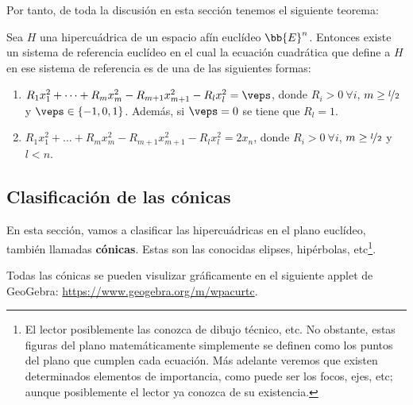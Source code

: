 Por tanto, de toda la discusión en esta sección tenemos el siguiente teorema:
\begin{teo}\label{teo:Clasif_Hiper}
    Sea $H$ una hipercuádrica de un espacio afín euclídeo $\bb{E}^n$. Entonces existe un sistema de referencia euclídeo en el cual la ecuación cuadrática que define a $H$ en ese sistema de referencia es de una de las siguientes formas:
    \begin{enumerate}
        \item $R_1x_1^2 + \dots + R_{m}x_{m}^2 - R_{m+1}x_{m+1}^2 - R_{l}x_{l}^2 = \veps$, donde $R_i>0~ \forall i$, $m\geq \nicefrac{l}{2}$ y $\veps \in \{-1,0,1\}$. Además, si $\veps=0$ se tiene que $R_l=1$.

        \item $R_1x_1^2 + \dots + R_{m}x_{m}^2 - R_{m+1}x_{m+1}^2 - R_{l}x_{l}^2 = 2x_n$, donde $R_i>0~ \forall i$, $m\geq \nicefrac{l}{2}$ y $l<n$.
    \end{enumerate}
\end{teo}


\subsection{Clasificación de las cónicas}

En esta sección, vamos a clasificar las hipercuádricas en el plano euclídeo, también llamadas \textbf{cónicas}. Estas son las conocidas elipses, hipérbolas, etc\footnote{El lector posiblemente las conozca de dibujo técnico, etc. No obstante, estas figuras del plano matemáticamente simplemente se definen como los puntos del plano que cumplen cada ecuación. Más adelante veremos que existen determinados elementos de importancia, como puede ser los focos, ejes, etc; aunque posiblemente el lector ya conozca de su existencia.}.

Todas las cónicas se pueden visulizar gráficamente en el siguiente applet de GeoGebra: \href{https://www.geogebra.org/m/wpacurtc}{https://www.geogebra.org/m/wpacurtc}.

